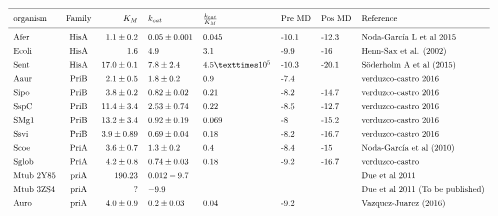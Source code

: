 \documentclass[]{article}
\begin{document}
{\[ 
\resizebox{\columnwidth}{!}{%
\begin{tabular}{ l c r l l l l l}
\hline \\ [-1.5ex]
organism  &Family & $K_M    $     & $k_{cat}$        & $\frac{k_{cat}}{K_M}$ &Pre MD & Pos MD & Reference  \\ [1ex]
\hline \\ [-1.5ex]
Afer        &HisA   & $1.1\pm0.2$   &$  0.05\pm0.001    $& 0.045                  &-10.1    &-12.3       &Noda-García L et al 2015\\ [1ex]
Ecoli       &HisA   &$  1.6         $&$         4.9       $&3.1                   &-9.9   &-16       &Henn-Sax et al. (2002)\\ [1ex]
Sent        &HisA   &$  17.0 \pm0.1 $&$ 7.8 \pm 2.4   $&$4.5 × 10^5          $&-10.3  &-20.1     &Söderholm A et al (2015)\\ [1ex]
Aaur        &PriB   &$  2.1 \pm 0.5 $& $    1.8 \pm 0.2     $&0.9                   &-7.4   &              &verduzco-castro 2016\\ [1ex]
Sipo        &PriB   &$  3.8\pm0.2     $&$0.82\pm0.02        $&0.21                  &-8.2     &-14.7       &verduzco-castro 2016\\ [1ex]
SspC        &PriB   &$  11.4\pm3.4  $&$2.53\pm0.74      $&0.22                  &   -8.5    &-12.7     &verduzco-castro 2016\\ [1ex]
SMg1        &PriB   &$  13.2\pm3.4  $&$0.92\pm0.19      $&0.069                 &-8     &-15.2     &verduzco-castro 2016\\ [1ex]
Ssvi        &PriB   &$  3.9\pm0.89  $&$0.69\pm0.04      $&0.18                  &-8.2     &-16.7     &verduzco-castro 2016\\ [1ex]
Scoe        &PriA   &$  3.6\pm0.7     $&$ 1.3\pm0.2     $  &0.4                   &-8.4   &-15       &Noda-García et al (2010)\\ [1ex]
Sglob       &PriA   & $4.2\pm0.8     $ & $0.74\pm0.03    $   &0.18                  &-9.2     &-16.7       &verduzco-castro\\ [1ex]
Mtub 2Y85   &priA   &$  19  0.23      $&$0.012  -9.7          $&                      &       &          &Due et al 2011\\ [1ex]
Mtub 3ZS4   &priA   &$  ?                 $&$-9.9               $&                      &       &          &Due et al 2011 (To be published)\\ [1ex]
Auro        &priA   &$  4.0 \pm 0.9 $&$0.2 \pm 0.03   $&0.04                    &-9.2       &          &Vazquez-Juarez (2016)\\ [1ex]

\end{tabular}}\]}
\end{document}
